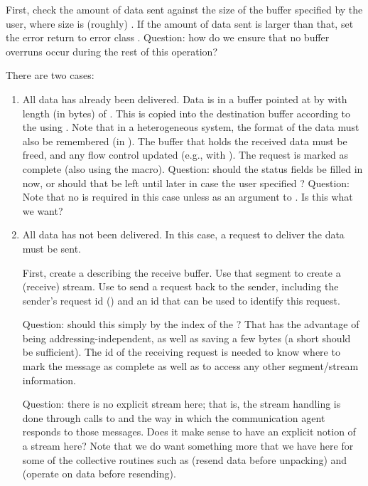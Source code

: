 \begin{mmadi}
\begin{tcp}
\begin{enumerate}
First, check the amount of data sent against the size of the buffer specified
by the user, where size is (roughly) .  If the
amount of data sent is larger than that, set the error return to error class
.   
Question: how do we ensure that no buffer overruns occur during the rest of
this operation?

There are two cases:
\begin{enumerate}
\item All data has already been delivered.  
Data is in a buffer pointed at by  with length
(in bytes) of .  This is copied into the
destination buffer according to the  using
.  Note that in a heterogeneous system, the format of the
data must also be remembered (in ).
The buffer that holds the received data must be freed, and any flow control
updated (e.g., with ).  The request is marked as
complete (also using the  macro).
Question: should the status fields be filled in now, or should that be left
until later in case the user specified ?
Question:  Note that no  is required in this case
unless as an argument to .  Is this what we want?

\item All data has not been delivered.  In this case, a request to deliver the
  data must be sent.  
  
  First, create a  describing the receive buffer.
  Use that segment to create a (receive) stream.
  Use  to send a request back to the
  sender, including the sender's request id
  () and an id that can be used to
  identify this request.  

  Question: should this simply by the index of the ?
  That has the advantage of being addressing-independent, as well as saving a
  few bytes (a short should be sufficient).  The id of the receiving request
  is needed to know where to mark the message as complete as well as to access
  any other segment/stream information.

  Question: there is no explicit stream here; that is, the stream handling is
  done through calls to  and the way in which the
  communication agent responds to those messages.  Does it make sense to have
  an explicit notion of a stream here?  Note that we do want something more
  that we have here for some of the collective routines such as
   (resend data before unpacking) and
   (operate on data before resending).


\end{enumerate}
\end{enumerate}
\end{tcp}
\end{mmadi}
